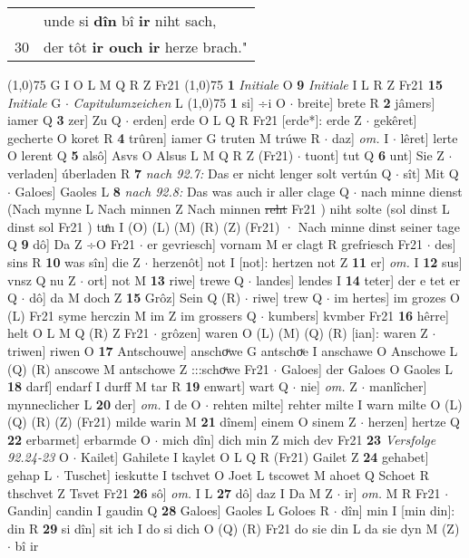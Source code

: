\documentclass[8pt,a4paper,notitlepage]{article}
\begin{document}
\begin{table}[ht]
\begin{minipage}[t]{0.5\linewidth}
\begin{tabular}{rl}
 & unde si \textbf{dîn} bî \textbf{ir} niht sach,\\ 
30 & der tôt \textbf{ir ouch ir} herze brach."\\ 
\end{tabular}
\scriptsize
\line(1,0){75} \newline
G I O L M Q R Z Fr21 \newline
\line(1,0){75} \newline
\textbf{1} \textit{Initiale} O  \textbf{9} \textit{Initiale} I L R Z Fr21  \textbf{15} \textit{Initiale} G   $\cdot$ \textit{Capitulumzeichen} L  \newline
\line(1,0){75} \newline
\textbf{1} si] ÷i O  $\cdot$ breite] brete R \textbf{2} jâmers] iamer Q \textbf{3} zer] Zu Q  $\cdot$ erden] erde O L Q R Fr21 [erde*]: erde Z  $\cdot$ gekêret] gecherte O koret R \textbf{4} trûren] iamer G truten M trúwe R  $\cdot$ daz] \textit{om.} I  $\cdot$ lêret] lerte O lerent Q \textbf{5} alsô] Asvs O Alsus L M Q R Z (Fr21)  $\cdot$ tuont] tut Q \textbf{6} unt] Sie Z  $\cdot$ verladen] úberladen R \textbf{7} \textit{nach 92.7:} Das er nicht lenger solt vertún Q   $\cdot$ sît] Mit Q  $\cdot$ Galoes] Gaoles L \textbf{8} \textit{nach 92.8:} Das was auch ir aller clage Q   $\cdot$ nach minne dienst (Nach mynne L Nach minnen Z Nach minnen \sout{reht} Fr21 ) niht solte (sol dinst L dinst sol Fr21 ) tuͤn I (O) (L) (M) (R) (Z) (Fr21) · Nach minne dinst seiner tage Q \textbf{9} dô] Da Z ÷O Fr21  $\cdot$ er gevriesch] vornam M er clagt R grefriesch Fr21  $\cdot$ des] sins R \textbf{10} was sîn] die Z  $\cdot$ herzenôt] not I [not]: hertzen not Z \textbf{11} er] \textit{om.} I \textbf{12} sus] vnsz Q nu Z  $\cdot$ ort] not M \textbf{13} riwe] trewe Q  $\cdot$ landes] lendes I \textbf{14} teter] der e tet er Q  $\cdot$ dô] da M doch Z \textbf{15} Grôz] Sein Q (R)  $\cdot$ riwe] trew Q  $\cdot$ im hertes] im grozes O (L) Fr21 syme herczin M im Z im grossers Q  $\cdot$ kumbers] kvmber Fr21 \textbf{16} hêrre] helt O L M Q (R) Z Fr21  $\cdot$ grôzen] waren O (L) (M) (Q) (R) [ian]: waren  Z  $\cdot$ triwen] riwen O \textbf{17} Antschouwe] anschoͮwe G antschoͮe I anschawe O Anschowe L (Q) (R) anscowe M antschowe Z :::schoͮwe Fr21  $\cdot$ Galoes] der Galoes O Gaoles L \textbf{18} darf] endarf I durff M tar R \textbf{19} enwart] wart Q  $\cdot$ nie] \textit{om.} Z  $\cdot$ manlîcher] mynneclicher L \textbf{20} der] \textit{om.} I de O  $\cdot$ rehten milte] rehter milte I warn milte O (L) (Q) (R) (Z) (Fr21) milde warin M \textbf{21} dînem] einem O sinem Z  $\cdot$ herzen] hertze Q \textbf{22} erbarmet] erbarmde O  $\cdot$ mich dîn] dich min Z mich dev Fr21 \textbf{23} \textit{Versfolge 92.24-23} O   $\cdot$ Kailet] Gahilete I kaylet O L Q R (Fr21) Gailet Z \textbf{24} gehabet] gehap L  $\cdot$ Tuschet] ieskutte I tschvet O Joet L tscowet M ahoet Q Schoet R thschvet Z Tsvet Fr21 \textbf{26} sô] \textit{om.} I L \textbf{27} dô] daz I Da M Z  $\cdot$ ir] \textit{om.} M R Fr21  $\cdot$ Gandin] candin I gaudin Q \textbf{28} Galoes] Gaoles L Goloes R  $\cdot$ dîn] min I [min din]: din R \textbf{29} si dîn] sit ich I do si dich O (Q) (R) Fr21 do sie din L da sie dyn M (Z)  $\cdot$ bî ir 
\end{minipage}
\end{table}
\end{document}
